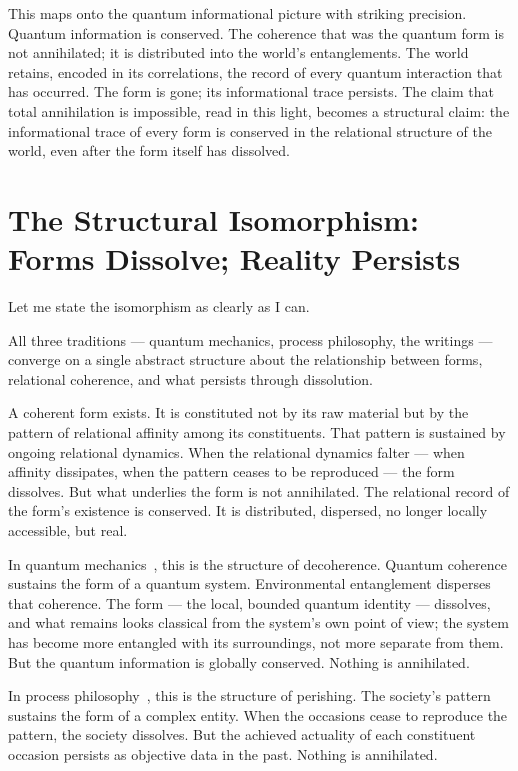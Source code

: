 This maps onto the quantum informational picture with striking precision.
Quantum information is conserved.
The coherence that was the quantum form is not annihilated; it is distributed into the world's entanglements.
The world retains, encoded in its correlations, the record of every quantum interaction that has occurred.
The form is gone; its informational trace persists.
The \bahai claim that total annihilation is impossible, read in this light, becomes a structural claim: the informational trace of every form is conserved in the relational structure of the world, even after the form itself has dissolved.

\section{The Structural Isomorphism: Forms Dissolve; Reality Persists}
\label{sec:ch10-convergence}

Let me state the isomorphism as clearly as I can.

All three traditions --- quantum mechanics, process philosophy, the \bahai writings --- converge on a single abstract structure about the relationship between forms, relational coherence, and what persists through dissolution.

A coherent form exists.
It is constituted not by its raw material but by the pattern of relational affinity among its constituents.
That pattern is sustained by ongoing relational dynamics.
When the relational dynamics falter --- when affinity dissipates, when the pattern ceases to be reproduced --- the form dissolves.
But what underlies the form is not annihilated.
The relational record of the form's existence is conserved.
It is distributed, dispersed, no longer locally accessible, but real.

In quantum mechanics~\citep{Zurek2003}, this is the structure of decoherence.
Quantum coherence sustains the form of a quantum system.
Environmental entanglement disperses that coherence.
The form --- the local, bounded quantum identity --- dissolves, and what remains looks classical from the system's own point of view; the system has become more entangled with its surroundings, not more separate from them.
But the quantum information is globally conserved.
Nothing is annihilated.

In process philosophy~\citep{Whitehead1929}, this is the structure of perishing.
The society's pattern sustains the form of a complex entity.
When the occasions cease to reproduce the pattern, the society dissolves.
But the achieved actuality of each constituent occasion persists as objective data in the past.
Nothing is annihilated.

